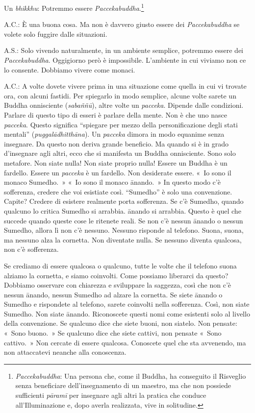 Un \emph{bhikkhu}: Potremmo essere \emph{Paccekabuddha}.\footnote{\emph{Paccekabuddha}:
  Una persona che, come il Buddha, ha conseguito il Risveglio senza
  beneficiare dell'insegnamento di un maestro, ma che non possiede
  sufficienti \emph{pāramī} per insegnare agli altri la pratica che
  conduce all'Illuminazione e, dopo averla realizzata, vive in
  solitudine.}

A.C.: È una buona cosa. Ma non è davvero giusto essere dei
\emph{Paccekabuddha} se volete solo fuggire dalle situazioni.

A.S.: Solo vivendo naturalmente, in un ambiente semplice, potremmo
essere dei \emph{Paccekabuddha}. Oggigiorno però è impossibile.
L'ambiente in cui viviamo non ce lo consente. Dobbiamo vivere come
monaci.

A.C.: A volte dovete vivere prima in una situazione come quella in cui
vi trovate ora, con alcuni fastidi. Per spiegarlo in modo semplice,
alcune volte sarete un Buddha onnisciente (\emph{sabaññū}), altre volte
un \emph{pacceka}. Dipende dalle condizioni. Parlare di questo tipo di
esseri è parlare della mente. Non è che uno nasce \emph{pacceka}. Questo
significa ``spiegare per mezzo della personificazione degli stati
mentali'' (\emph{puggalādhitthāna}). Un \emph{pacceka} dimora in modo
equanime senza insegnare. Da questo non deriva grande beneficio. Ma
quando si è in grado d'insegnare agli altri, ecco che si manifesta un
Buddha onnisciente. Sono solo metafore. Non siate nulla! Non siate
proprio nulla! Essere un Buddha è un fardello. Essere un \emph{pacceka}
è un fardello. Non desiderate essere. «~Io sono il monaco Sumedho.~»
«~Io sono il monaco ānando.~» In questo modo c'è sofferenza, credere che
voi esistiate così. ``Sumedho'' è solo una convenzione. Capite? Credere
di esistere realmente porta sofferenza. Se c'è Sumedho, quando qualcuno
lo critica Sumedho si arrabbia. ānando si arrabbia. Questo è quel che
succede quando queste cose le ritenete reali. Se non c'è nessun ānando o
nessun Sumedho, allora lì non c'è nessuno. Nessuno risponde al telefono.
Suona, suona, ma nessuno alza la cornetta. Non diventate nulla. Se
nessuno diventa qualcosa, non c'è sofferenza.

Se crediamo di essere qualcosa o qualcuno, tutte le volte che il
telefono suona alziamo la cornetta, e siamo coinvolti. Come possiamo
liberarci da questo? Dobbiamo osservare con chiarezza e sviluppare la
saggezza, così che non c'è nessun ānando, nessun Sumedho ad alzare la
cornetta. Se siete ānando o Sumedho e rispondete al telefono, sarete
coinvolti nella sofferenza. Così, non siate Sumedho. Non siate ānando.
Riconoscete questi nomi come esistenti solo al livello della
convenzione. Se qualcuno dice che siete buoni, non siatelo. Non pensate:
«~Sono buono.~» Se qualcuno dice che siete cattivi, non pensate «~Sono
cattivo.~» Non cercate di essere qualcosa. Conoscete quel che sta
avvenendo, ma non attaccatevi neanche alla conoscenza.

